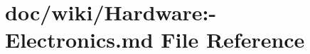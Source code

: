\hypertarget{_hardware_1-_electronics_8md}{}\section{doc/wiki/\+Hardware\+:-\/\+Electronics.md File Reference}
\label{_hardware_1-_electronics_8md}
